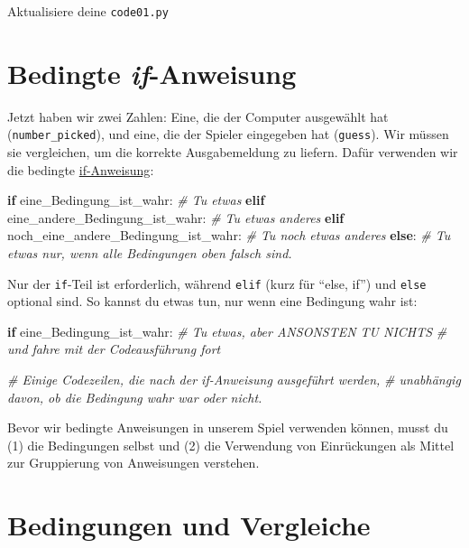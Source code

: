 \documentclass[
]{book}
\newenvironment{Shaded}{\begin{snugshade}}{\end{snugshade}}
\newcommand{\CommentTok}[1]{\textcolor[rgb]{0.56,0.35,0.01}{\textit{#1}}}
\newcommand{\ControlFlowTok}[1]{\textcolor[rgb]{0.13,0.29,0.53}{\textbf{#1}}}
\newcommand{\NormalTok}[1]{#1}
\begin{document}
Aktualisiere deine \texttt{code01.py}

\hypertarget{if-statement}{%
\section{\texorpdfstring{Bedingte \emph{if}-Anweisung}{Bedingte if-Anweisung}}\label{if-statement}}

Jetzt haben wir zwei Zahlen: Eine, die der Computer ausgewählt hat (\texttt{number\_picked}), und eine, die der Spieler eingegeben hat (\texttt{guess}). Wir müssen sie vergleichen, um die korrekte Ausgabemeldung zu liefern. Dafür verwenden wir die bedingte \href{https://docs.python.org/3/tutorial/controlflow.html\#if-statements}{if-Anweisung}:

\begin{Shaded}
\begin{Highlighting}[]
\ControlFlowTok{if}\NormalTok{ eine\_Bedingung\_ist\_wahr:}
    \CommentTok{\# Tu etwas}
\ControlFlowTok{elif}\NormalTok{ eine\_andere\_Bedingung\_ist\_wahr:}
    \CommentTok{\# Tu etwas anderes}
\ControlFlowTok{elif}\NormalTok{ noch\_eine\_andere\_Bedingung\_ist\_wahr:}
    \CommentTok{\# Tu noch etwas anderes}
\ControlFlowTok{else}\NormalTok{:}
    \CommentTok{\# Tu etwas nur, wenn alle Bedingungen oben falsch sind.}
\end{Highlighting}
\end{Shaded}

Nur der \texttt{if}-Teil ist erforderlich, während \texttt{elif} (kurz für ``else, if'') und \texttt{else} optional sind. So kannst du etwas tun, nur wenn eine Bedingung wahr ist:

\begin{Shaded}
\begin{Highlighting}[]
\ControlFlowTok{if}\NormalTok{ eine\_Bedingung\_ist\_wahr:}
    \CommentTok{\# Tu etwas, aber ANSONSTEN TU NICHTS }
    \CommentTok{\# und fahre mit der Codeausführung fort}
  
\CommentTok{\# Einige Codezeilen, die nach der if{-}Anweisung ausgeführt werden,}
\CommentTok{\# unabhängig davon, ob die Bedingung wahr war oder nicht.}
\end{Highlighting}
\end{Shaded}

Bevor wir bedingte Anweisungen in unserem Spiel verwenden können, musst du (1) die Bedingungen selbst und (2) die Verwendung von Einrückungen als Mittel zur Gruppierung von Anweisungen verstehen.

\hypertarget{comparisons}{%
\section{Bedingungen und Vergleiche}\label{comparisons}}
\end{document}
